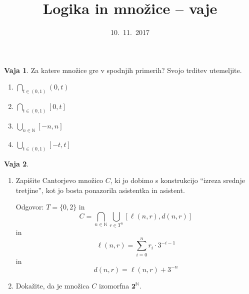 \documentclass{article}
\newcommand{\two}{\mathbf{2}}
\newcommand{\NN}{\mathbb{N}}
\theoremstyle{definition}
\newtheorem{vaja}{Vaja}
\begin{document}
\title{Logika in množice -- vaje}
\date{10.~11.~2017}
\maketitle

\begin{vaja}
  Za katere množice gre v spodnjih primerih? Svojo trditev utemeljite.
  \begin{enumerate}
    \item
      $\displaystyle{\bigcap_{t \in (0, 1)} (0, t)}$
    \item
      $\displaystyle{\bigcap_{t \in (0, 1)} [0, t]}$
    \item
      $\displaystyle{\bigcup_{n \in \NN} [-n, n]}$
    \item
      $\displaystyle{\bigcup_{t \in (0, 1)} [-t, t]}$
  \end{enumerate}
\end{vaja}

\begin{vaja}
  \begin{enumerate}

  \item Zapišite Cantorjevo množico $C$, ki jo dobimo s konstrukcijo ``izreza srednje
    tretjine'', kot jo bosta ponazorila asistentka in asistent.

    Odgovor: $T = \{0, 2\}$ in
    \[C = \bigcap_{n \in \NN} \bigcup_{r \in T^n} 
          [\ell(n,r), d(n,r)]
    \]
    in
    \[\ell(n,r) = \sum_{i = 0}^{n} r_i \cdot 3^{-i-1}\]
    in
    \[d(n, r) = \ell(n, r) + 3^{-n}\]

  \item Dokažite, da je množica $C$ izomorfna $\two^\NN$.
  \end{enumerate}
\end{vaja}
\end{document}

